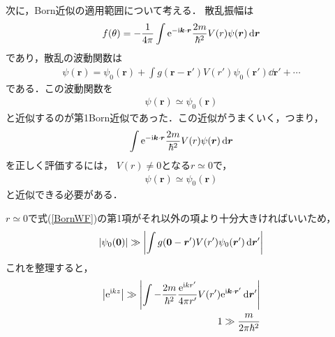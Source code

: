 \documentclass{report}
\begin{document}
 次に，Born近似の適用範囲について考える．
 散乱振幅は
 \begin{align}
  f(\theta) = -\frac{1}{4\pi} \int \mathrm{e}^{-\mathrm{i} \bm{k}\cdot \bm{r}} \frac{2m}{\hbar^2}V(r)\psi(\bm{r})\dd{\bm{r}}
 \end{align}
 であり，散乱の波動関数は
 \begin{align}
  \label{BornWF}
  \psi(\bm{r}) = \psi_0(\bm{r}) + \int g(\bm{r} - \bm{r'}) V(r') \psi_0(\bm{r'}) \dd{\bm{r'}} + \cdots
 \end{align}
 である．この波動関数を
 \begin{align}
  \psi(\bm{r}) \simeq \psi_0(\bm{r})
 \end{align}
 と近似するのが第1Born近似であった．この近似がうまくいく，つまり，
 \begin{align}
  \int \mathrm{e}^{-\mathrm{i} \bm{k}\cdot \bm{r}} \frac{2m}{\hbar^2}V(r)\psi(\bm{r})\dd{\bm{r}}
 \end{align}
 を正しく評価するには，
 $V(r) \neq 0$となる$r\simeq 0$で，
 \begin{align}
  \psi(\bm{r}) \simeq \psi_0(\bm{r})
 \end{align}
 と近似できる必要がある．

 $r \simeq 0$で式(\ref{BornWF})の第1項がそれ以外の項より十分大きければいいため，
 \begin{align}
  \abs{\psi_0(\bm{0})} \gg \abs{\int g(\bm{0} - \bm{r}') V(r') \psi_0(\bm{r}') \dd{\bm{r}'}}
 \end{align}
 これを整理すると，
 \begin{align}
  \abs{\mathrm{e}^{\mathrm{i} kz}} \gg \abs{\int -\frac{2m}{\hbar^2}\frac{\mathrm{e}^{\mathrm{i} kr'}}{4\pi r'}V(r') \mathrm{e}^{\mathrm{i} \bm{k}\cdot\bm{r}'}\dd{\bm{r}'}}\\
  1 \gg \frac{m}{2\pi \hbar^2}
 \end{align}
\end{document}
